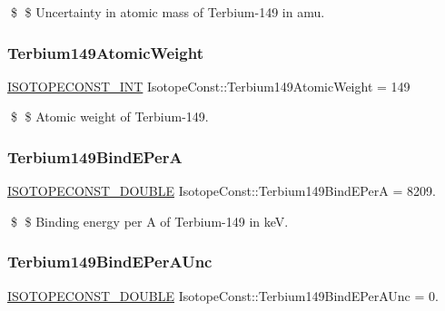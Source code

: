 \$ \$ Uncertainty in atomic mass of Terbium-\/149 in amu. \mbox{\label{group___isotope_const-_terbium-_tb149_ga4275291eb122d7176299fe2651d9455d}} 
\subsubsection{\texorpdfstring{Terbium149\+Atomic\+Weight}{Terbium149AtomicWeight}}
{\footnotesize\ttfamily \mbox{\hyperlink{group___isotope_const-_macros_ga5f18360b3e99483a35c32d789e62621c}{I\+S\+O\+T\+O\+P\+E\+C\+O\+N\+S\+T\+\_\+\+I\+NT}} Isotope\+Const\+::\+Terbium149\+Atomic\+Weight = 149}

\$ \$ Atomic weight of Terbium-\/149. \mbox{\label{group___isotope_const-_terbium-_tb149_ga55f8709123639ef121be24d1371c0225}} 
\subsubsection{\texorpdfstring{Terbium149\+Bind\+E\+PerA}{Terbium149BindEPerA}}
{\footnotesize\ttfamily \mbox{\hyperlink{group___isotope_const-_macros_ga8f45a7272ce02c0b4c65c44636ed719a}{I\+S\+O\+T\+O\+P\+E\+C\+O\+N\+S\+T\+\_\+\+D\+O\+U\+B\+LE}} Isotope\+Const\+::\+Terbium149\+Bind\+E\+PerA = 8209.}

\$ \$ Binding energy per A of Terbium-\/149 in keV. \mbox{\label{group___isotope_const-_terbium-_tb149_ga15e89369d9ccf8b76b25ffe7889d0930}} 
\subsubsection{\texorpdfstring{Terbium149\+Bind\+E\+Per\+A\+Unc}{Terbium149BindEPerAUnc}}
{\footnotesize\ttfamily \mbox{\hyperlink{group___isotope_const-_macros_ga8f45a7272ce02c0b4c65c44636ed719a}{I\+S\+O\+T\+O\+P\+E\+C\+O\+N\+S\+T\+\_\+\+D\+O\+U\+B\+LE}} Isotope\+Const\+::\+Terbium149\+Bind\+E\+Per\+A\+Unc = 0.}

